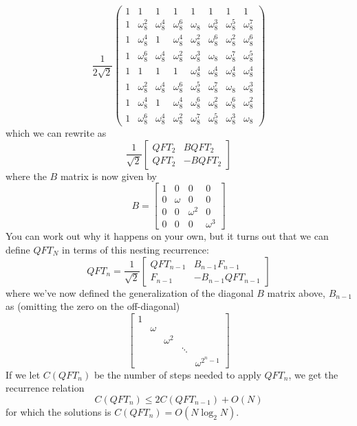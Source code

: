 \[
\frac{1}{2\sqrt{2}}\begin{pmatrix}
1 & 1 & 1 & 1 & 1 & 1 & 1 & 1 \\
1 & \omega_8^2 & \omega_8^4 & \omega_8^6 & \omega_8 & \omega_8^3 & \omega_8^5 & \omega_8^7 \\
1 & \omega_8^4 & 1 & \omega_8^4 & \omega_8^2 & \omega_8^6 & \omega_8^2 & \omega_8^6 \\
1 & \omega_8^6 & \omega_8^4 & \omega_8^2 & \omega_8^3 & \omega_8 & \omega_8^7 & \omega_8^5 \\
1 & 1 & 1 & 1 & \omega_8^4 & \omega_8^4 & \omega_8^4 & \omega_8^4 \\
1 & \omega_8^2 & \omega_8^4 & \omega_8^6 & \omega_8^5 & \omega_8^7 & \omega_8 & \omega_8^3 \\
1 & \omega_8^4 & 1 & \omega_8^4 & \omega_8^6 & \omega_8^2 & \omega_8^6 & \omega_8^2 \\
1 & \omega_8^6 & \omega_8^4 & \omega_8^2 & \omega_8^7 & \omega_8^5 & \omega_8^3 & \omega_8
\end{pmatrix}
\]
which we can rewrite as
\[
\frac{1}{\sqrt{2}}\begin{bmatrix}
    QFT_2 & B QFT_2\\
    QFT_2 & -BQFT_2
\end{bmatrix}
\]
where the $B$ matrix is now given by
\[
B=\begin{bmatrix}
    1 & 0 & 0 & 0 \\
    0 & \omega & 0 & 0 \\
    0 & 0 & \omega^2 & 0\\
    0 & 0& 0 &  \omega^3
\end{bmatrix}
\]
You can work out why it happens on your own, but it turns out that we can define $QFT_N$ in terms of this nesting recurrence:
\[
QFT_n = \frac{1}{\sqrt{2}}\begin{bmatrix}
    QFT_{n-1} & B_{n-1} F_{n-1}\\
    F_{n-1} & -B_{n-1}QFT_{n-1}
\end{bmatrix}
\]
where we've now defined the generalization of the diagonal $B$ matrix above, $B_{n-1}$ as (omitting the zero on the off-diagonal)
\[
\begin{bmatrix}
    1 & & & & \\
    & \omega & & & \\
    &&\omega^2 &&\\
    &&&\ddots &\\
    &&&&\omega^{2^n-1}
\end{bmatrix}
\]
If we let $C(QFT_n)$ be the number of steps needed to apply $QFT_n$, we get the recurrence relation
\[
C(QFT_n)\leq 2C(QFT_{n-1})+O(N)
\]
for which the solutions is $C(QFT_n)=O(N\log_2 N)$.

